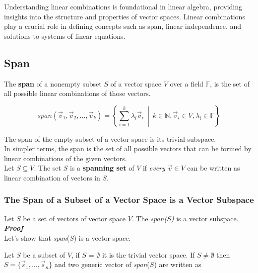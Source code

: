 \label{def:linear-combination}



Understanding linear combinations is foundational in linear algebra, providing insights into the structure and properties of vector spaces. Linear combinations play a crucial role in defining concepts such as span, linear independence, and solutions to systems of linear equations.
\subsection{Span}

The \textbf{span} of a nonempty subset $S$ of a vector space $V$ over a field $\mathbb F$, is the set of all possible linear combinations of those vectors.

$$
\textit{span}(\vec{v}_1, \vec{v}_2, \ldots, \vec{v}_k) = \left\{ \sum_{i=1}^k \lambda_i \vec{v}_i \ \middle| \ k \in \mathbb{N}, \vec{v}_i \in V, \lambda_i \in \mathbb F \right\}
$$

The span of the empty subset of a vector space is its trivial subspace.
\\

In simpler terms, the span is the set of all possible vectors that can be formed by linear combinations of the given vectors.
\\

Let $S \subseteq V$. The set $S$ is a \textbf{spanning set} of $V$ if \textit{every} $\vec v \in V$ can be written as linear combination of vectors in $S$.


\subsubsection{The Span of a Subset of a Vector Space is a Vector Subspace}

Let $S$ be a set of vectors of vector space $V$. The {\textit{span($S$)}} is a vector subspace.
\\

\textbf{\textit{Proof}}
\\

Let's show that \textit{span}($S$) is a vector space. 

Let $S$ be a subset of $V$, if $S$ = $\emptyset$ it is the trivial vector space. If $S \neq \emptyset$ then $S = \{\vec s_1, \dots , \vec s_n\}$ and two generic vector of \textit{span}($S$) are written as 

